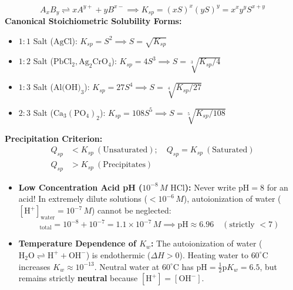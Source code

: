 \documentclass[10pt,twoside,openright]{book}
\begin{document}
\begin{formulabox}
\begin{equation}
  A_x B_y \rightleftharpoons x A^{y+} + y B^{x-} \implies K_{sp} = (x S)^x (y S)^y = x^x y^y S^{x+y}
\end{equation}
\textbf{Canonical Stoichiometric Solubility Forms:}
\begin{itemize}[leftmargin=*]
  \item $1:1$ Salt ($\text{AgCl}$): $K_{sp} = S^2 \implies S = \sqrt{K_{sp}}$
  \item $1:2$ Salt ($\text{PbCl}_2, \text{Ag}_2\text{CrO}_4$): $K_{sp} = 4S^3 \implies S = \sqrt[3]{K_{sp}/4}$
  \item $1:3$ Salt ($\text{Al(OH)}_3$): $K_{sp} = 27S^4 \implies S = \sqrt[4]{K_{sp}/27}$
  \item $2:3$ Salt ($\text{Ca}_3(\text{PO}_4)_2$): $K_{sp} = 108S^5 \implies S = \sqrt[5]{K_{sp}/108}$
\end{itemize}
\textbf{Precipitation Criterion:}
\begin{align}
  Q_{sp} &< K_{sp} \ (\text{Unsaturated}); \quad Q_{sp} = K_{sp} \ (\text{Saturated}) \\
  Q_{sp} &> K_{sp} \ (\text{Precipitates})
\end{align}
\end{formulabox}

\begin{trapbox}
\begin{itemize}
  \item \textbf{Low Concentration Acid pH ($10^{-8}\,\si{M}\text{ HCl}$):} Never write $\text{pH} = 8$ for an acid! In extremely dilute solutions ($< 10^{-6}\,\si{M}$), autoionization of water ($[\text{H}^+]_{\text{water}} = 10^{-7}\,\si{M}$) cannot be neglected:
  \begin{equation*}
    [\text{H}^+]_{\text{total}} = 10^{-8} + 10^{-7} = 1.1\times 10^{-7}\,\si{M} \implies \text{pH} \approx 6.96 \quad (\text{strictly } < 7)
  \end{equation*}
  \item \textbf{Temperature Dependence of $K_w$:} The autoionization of water ($\text{H}_2\text{O} \rightleftharpoons \text{H}^+ + \text{OH}^-$) is endothermic ($\Delta H > 0$). Heating water to $60^\circ\text{C}$ increases $K_w \approx 10^{-13}$. Neutral water at $60^\circ\text{C}$ has $\text{pH} = \frac{1}{2}\text{p}K_w = 6.5$, but remains strictly \textbf{neutral} because $[\text{H}^+] = [\text{OH}^-]$.
\end{itemize}
\end{trapbox}
\end{document}
